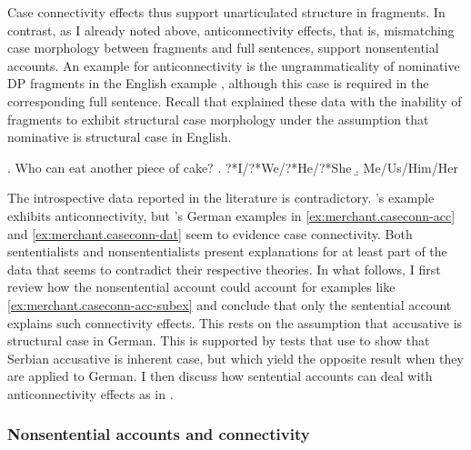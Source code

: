 Case connectivity effects thus support unarticulated structure in fragments. In contrast, as I already noted above, anticonnectivity effects, that is, mismatching case morphology between fragments and full sentences, support nonsentential accounts. An example for anticonnectivity is the ungrammaticality of nominative DP fragments in the English example \Next, although this case is required in the corresponding full sentence. Recall that \citet{barton.progovac2005} explained these data with the inability of fragments to exhibit structural case morphology under the assumption that nominative is structural case in English.

\ex. Who can eat another piece of cake? \hfill \citep[77]{barton.progovac2005} \label{ex:barton.case-rep}
\a. ?*I/?*We/?*He/?*She
\b. Me/Us/Him/Her

The introspective data reported in the literature is contradictory. \citeauthor{barton.progovac2005}'s example \Last exhibits anticonnectivity, but \citeauthor{merchant2004}'s German examples in \ref{ex:merchant.caseconn-acc} and \ref{ex:merchant.caseconn-dat} seem to evidence case connectivity. Both sententialists and nonsententialists present explanations for at least part of the data that seems to contradict their respective theories. In what follows, I first review how the nonsentential account could account for examples like \ref{ex:merchant.caseconn-acc-subex} and conclude that only the sentential account explains such connectivity effects. This rests on the assumption that accusative is structural case in German. This is supported by tests that \citet{progovac2006} use to show that Serbian accusative is inherent case, but which yield the opposite result when they are applied to German. I then discuss how sentential accounts can deal with anticonnectivity effects as in \LLast. 

\subsubsection{Nonsentential accounts and connectivity}

